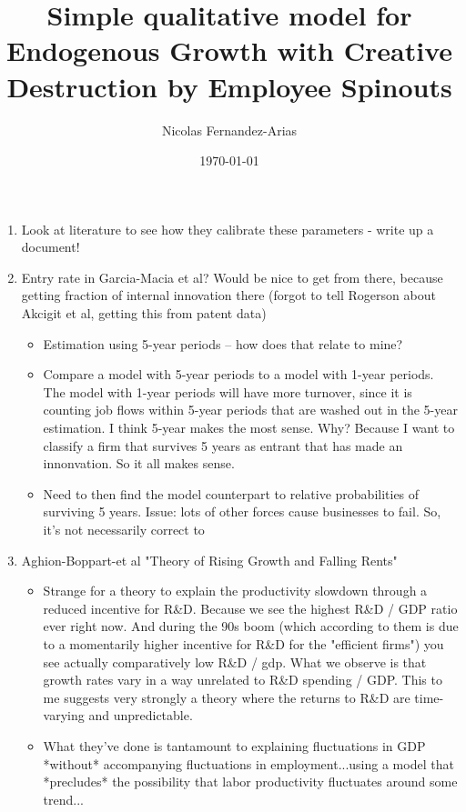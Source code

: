 \documentclass[12pt,english]{article}
\theoremstyle{remark}
\begin{document}
	
\title{Simple qualitative model for Endogenous Growth with Creative Destruction by Employee Spinouts}
\author{Nicolas Fernandez-Arias}
\date{\today}
\maketitle

\begin{enumerate}
	\item Look at literature to see how they calibrate these parameters - write up a document!
	\item Entry rate in Garcia-Macia et al? Would be nice to get from there, because getting fraction of internal innovation there (forgot to tell Rogerson about Akcigit et al, getting this from patent data)
	\begin{itemize}
		\item Estimation using 5-year periods -- how does that relate to mine?
		\item Compare a model with 5-year periods to a model with 1-year periods. The model with 1-year periods will have more turnover, since it is counting job flows within 5-year periods that are washed out in the 5-year estimation. I think 5-year makes the most sense. Why? Because I want to classify a firm that survives 5 years as entrant that has made an innonvation. So it all makes sense.
		\item Need to then find the model counterpart to relative probabilities of surviving 5 years. Issue: lots of other forces cause businesses to fail. So, it's not necessarily correct to 
	\end{itemize}
	\item Aghion-Boppart-et al "Theory of Rising Growth and Falling Rents"
	\begin{itemize}
		\item Strange for a theory to explain the productivity slowdown through a reduced incentive for R\&D. Because we see the highest R\&D / GDP ratio ever right now. And during the 90s boom (which according to them is due to a momentarily higher incentive for R\&D for the "efficient firms") you see actually comparatively low R\&D / gdp. What we observe is that growth rates vary in a way unrelated to R\&D spending / GDP. This to me suggests very strongly a theory where the returns to R\&D are time-varying and unpredictable. 
		\item What they've done is tantamount to explaining fluctuations in GDP *without* accompanying fluctuations in employment...using a model that *precludes* the possibility that labor productivity fluctuates around some trend...

\end{itemize}
\end{enumerate}
\end{document}

